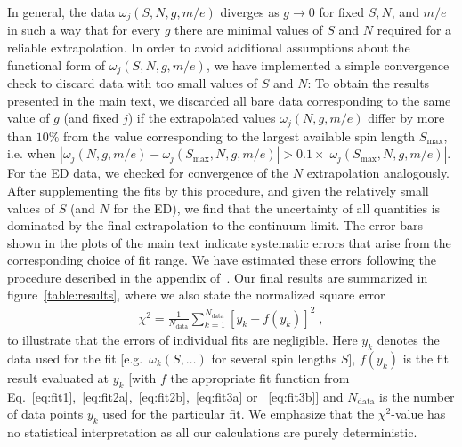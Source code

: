 \documentclass[aps,prl,reprint,twocolumn,superscriptaddress,floatfix,nofootinbib]{revtex4-1}
\begin{document}
In general, the data $\omega_j(S,N,g,m/e)$ diverges as $g \rightarrow 0$ for fixed $S,N$, and $m/e$ in such a way that for every $g$ there are minimal values of $S$ and $N$ required for a reliable extrapolation. In order to avoid additional assumptions about the functional form of $\omega_j(S,N,g,m/e)$, we have implemented a simple convergence check to discard data with too small values of $S$ and $N$: To obtain the results presented in the main text, we discarded all bare data corresponding to the same value of $g$ (and fixed $j$) if the extrapolated values $\omega_j(N,g,m/e)$ differ by more than $10\%$ from the value corresponding to the largest available spin length $S_\text{max}$, i.e. when $|\omega_j(N,g,m/e) - \omega_j(S_\text{max},N,g,m/e)| > 0.1 \times  |\omega_j(S_\text{max},N,g,m/e)|$. For the ED data, we checked for convergence of the $N$ extrapolation analogously. After supplementing the fits by this procedure, and given the relatively small values of $S$ (and $N$ for the ED), we find that the uncertainty of all quantities is dominated by the final extrapolation to the continuum limit. The error bars shown in the plots of the main text indicate systematic errors that arise from the corresponding choice of fit range. We have estimated these errors following the procedure described in the appendix of~\cite{banuls2013mass}.  Our final results are summarized in figure~\ref{table:results}, { where we also state the normalized square error 
	\begin{align}
		\chi^2 = \frac{1}{N_{\text{data}}}\sum_{k=1}^{N_{\text{data}}} \left[ y_k - f(y_k) \right]^2  \;,
	\end{align}
	to illustrate that the errors of individual fits are negligible.
	Here $y_k$ denotes the data used for the fit [e.g.~$\omega_k(S, \dots)$ for several spin lengths $S$], $f(y_k)$ is the fit result evaluated at $y_k$ [with $f$ the appropriate fit function from Eq.~\eqref{eq:fit1},~\eqref{eq:fit2a},~\eqref{eq:fit2b},~\eqref{eq:fit3a} or ~\eqref{eq:fit3b}] and $N_\text{data}$ is the number of data points $y_k$ used for the particular fit. We emphasize that the $\chi^2$-value has no statistical interpretation as all our calculations are purely deterministic.
} 
\end{document}
